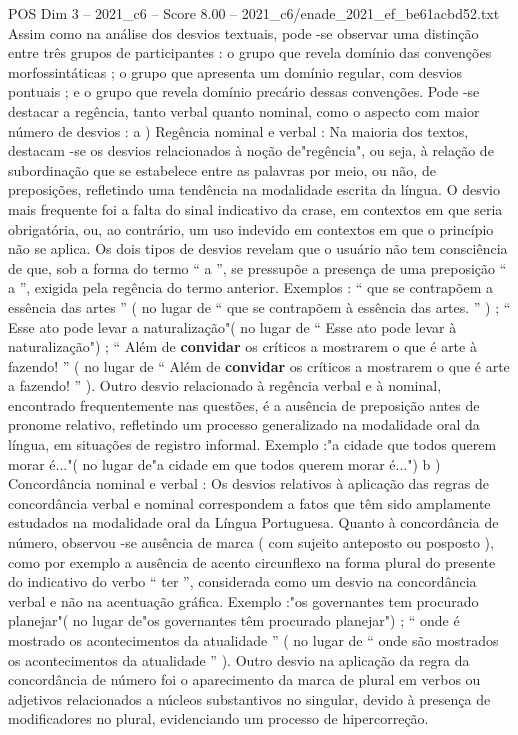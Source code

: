 \begin{textsample}{POS Dim 3 – 2021\_c6 – Score 8.00 – 2021\_c6/enade\_2021\_ef\_be61acbd52.txt}
Assim como na análise dos desvios textuais, pode -se observar uma distinção entre três grupos de participantes : o grupo que revela domínio das convenções morfossintáticas ; o grupo que apresenta um domínio regular, com desvios pontuais ; e o grupo que revela domínio precário dessas convenções.
Pode -se destacar a regência, tanto verbal quanto nominal, como o aspecto com maior número de desvios : a ) Regência nominal e verbal : Na maioria dos textos, destacam -se os desvios relacionados à noção de"regência", ou seja, à relação de subordinação que se estabelece entre as palavras por meio, ou não, de preposições, refletindo uma tendência na modalidade escrita da língua.
O desvio mais frequente foi a falta do sinal indicativo da crase, em contextos em que seria obrigatória, ou, ao contrário, um uso indevido em contextos em que o princípio não se aplica.
Os dois tipos de desvios revelam que o usuário não tem consciência de que, sob a forma do termo “ a ”, se pressupõe a presença de uma preposição “ a ”, exigida pela regência do termo anterior.
Exemplos : “ que se contrapõem a essência das artes ” ( no lugar de “ que se contrapõem à essência das artes. ” ) ; “ Esse ato pode levar a naturalização"( no lugar de “ Esse ato pode levar à naturalização") ; “ Além de \textbf{convidar} os críticos a mostrarem o que é arte à fazendo! ” ( no lugar de “ Além de \textbf{convidar} os críticos a mostrarem o que é arte a fazendo! ” ).
Outro desvio relacionado à regência verbal e à nominal, encontrado frequentemente nas questões, é a ausência de preposição antes de pronome relativo, refletindo um processo generalizado na modalidade oral da língua, em situações de registro informal.
Exemplo :"a cidade que todos querem morar é..."( no lugar de"a cidade em que todos querem morar é...") b ) Concordância nominal e verbal : Os desvios relativos à aplicação das regras de concordância verbal e nominal correspondem a fatos que têm sido amplamente estudados na modalidade oral da Língua Portuguesa.
Quanto à concordância de número, observou -se ausência de marca ( com sujeito anteposto ou posposto ), como por exemplo a ausência de acento circunflexo na forma plural do presente do indicativo do verbo “ ter ”, considerada como um desvio na concordância verbal e não na acentuação gráfica.
Exemplo :"os governantes tem procurado planejar"( no lugar de"os governantes têm procurado planejar") ; “ onde é mostrado os acontecimentos da atualidade ” ( no lugar de “ onde são mostrados os acontecimentos da atualidade ” ).
Outro desvio na aplicação da regra da concordância de número foi o aparecimento da marca de plural em verbos ou adjetivos relacionados a núcleos substantivos no singular, devido à presença de modificadores no plural, evidenciando um processo de hipercorreção.

\end{textsample}
